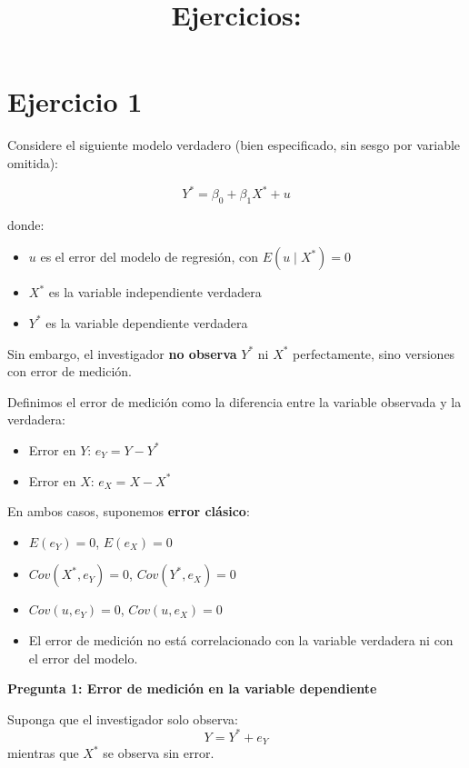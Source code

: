 \documentclass[12pt]{article}
\begin{document}
\title{Ejercicios: }

\maketitle

\section{Ejercicio 1} 

Considere el siguiente modelo verdadero (bien especificado, sin sesgo por variable omitida):

\[
Y^{*} = \beta_0 + \beta_1 X^{*} + u
\]

donde:
\begin{itemize}
    \item $u$ es el error del modelo de regresión, con $E(u \mid X^{*}) = 0$
    \item $X^{*}$ es la variable independiente verdadera
    \item $Y^{*}$ es la variable dependiente verdadera
\end{itemize}

Sin embargo, el investigador \textbf{no observa} $Y^{*}$ ni $X^{*}$ perfectamente, sino versiones con error de medición.


Definimos el error de medición como la diferencia entre la variable observada y la verdadera:
\begin{itemize}
    \item Error en $Y$: $e_Y = Y - Y^{*}$
    \item Error en $X$: $e_X = X - X^{*}$
\end{itemize}

En ambos casos, suponemos \textbf{error clásico}:
\begin{itemize}
    \item $E(e_Y) = 0$, $E(e_X) = 0$
    \item $Cov(X^{*}, e_Y) = 0$, $Cov(Y^{*}, e_X) = 0$
    \item $Cov(u, e_Y) = 0$, $Cov(u, e_X) = 0$
    \item El error de medición no está correlacionado con la variable verdadera ni con el error del modelo.
\end{itemize}

{\bf Pregunta 1: Error de medición en la variable dependiente}

Suponga que el investigador solo observa:
\[
Y = Y^{*} + e_Y
\]
mientras que $X^{*}$ se observa sin error.
\end{document}
